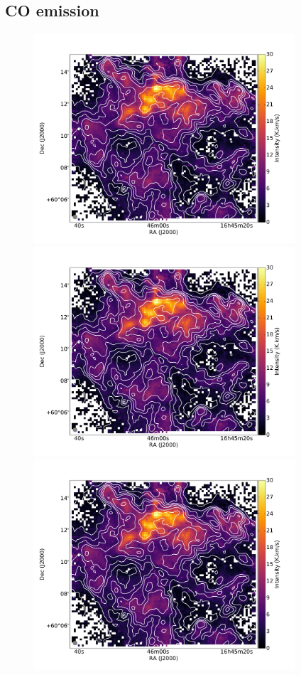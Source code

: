 \documentclass[traditabstract]{aa}
\begin{document}
   \subsection{CO emission}

\begin{figure}[h]
  \centering
  \includegraphics[page=1,height=7.8cm,trim=25 30 90 75,clip=true]{Figures/CO10_intensity.pdf}
  \hspace{3mm}
  \includegraphics[page=4,height=7.8cm,trim=195 30 260 75,clip=true]{Figures/CO10_intensity.pdf} \\
  \includegraphics[page=2,height=7.8cm,trim=55 30 120 75,clip=true]{Figures/CO10_intensity.pdf}

\end{figure}
\end{document}
